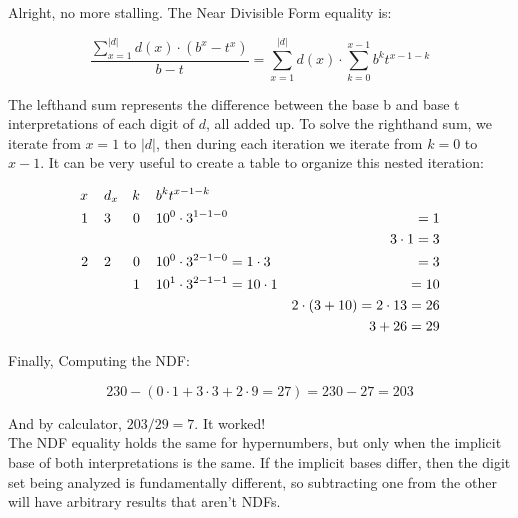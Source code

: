 \documentclass{article}
\begin{document}
\noindent Alright, no more stalling. The Near Divisible Form equality is:

$$\frac{\displaystyle \sum_{x=1}^{|d|} d(x) \cdot (b^x-t^x)}{b-t} = \sum_{x=1}^{|d|} d(x) \cdot \sum_{k=0}^{x-1} b^k t^{x-1-k}$$

\noindent The lefthand sum represents the difference between the base b and base t interpretations of each digit of $d$, all added up. To solve the righthand sum, we iterate from $x=1$ to $|d|$, then during each iteration we iterate from $k=0$ to $x-1$. It can be very useful to create a table to organize this nested iteration:

\begin{align*}
x \hspace{4mm}& d_x & k \hspace{4mm}& b^k t^{x-1-k}\\
1 \hspace{4mm}& 3 & 0 \hspace{4mm}& 10^0 \cdot 3^{1-1-0}& = 1\\
\hspace{4mm}&&&&3 \cdot 1 = 3\\
2\hspace{4mm} & 2 & 0 \hspace{4mm}& 10^0 \cdot 3^{2-1-0} = 1 \cdot 3 &= 3\\
\hspace{4mm}&& 1 \hspace{4mm}& 10^1 \cdot 3^{2-1-1} = 10 \cdot 1 &= 10\\
\hspace{4mm}&&\hspace{4mm}&&2 \cdot (3 + 10) = 2 \cdot 13 = 26\\
\hspace{4mm}&&&&3 + 26 = 29\\
\end{align*}

\noindent Finally, Computing the NDF:

$$230 - (0 \cdot 1 + 3 \cdot 3 + 2 \cdot 9 = 27) = 230 - 27 = 203$$

\noindent And by calculator, $203/29 = 7$. It worked!\\

\noindent The NDF equality holds the same for hypernumbers, but only when the implicit base of both interpretations is the same. If the implicit bases differ, then the digit set being analyzed is fundamentally different, so subtracting one from the other will have arbitrary results that aren't NDFs.
\end{document}
